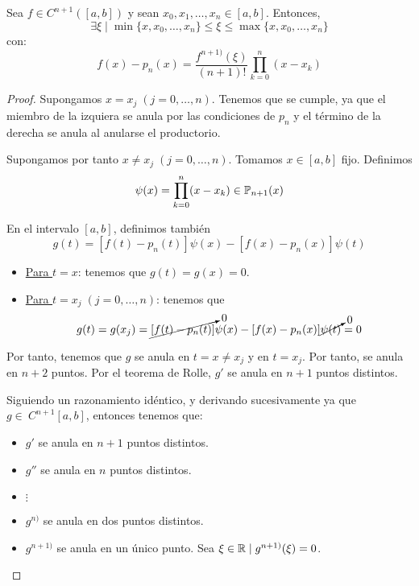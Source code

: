 \begin{teo}
    Sea $f\in C^{n+1}([a,b])$ y sean $x_0,x_1,\dots,x_n\in[a,b]$. Entonces,
    \begin{equation*}
        \exists \xi \mid \min\{x,x_0,\dots,x_n \} \leq \xi \leq \max\{x,x_0,\dots,x_n \} 
    \end{equation*}
    con:
    \begin{equation*}
        f(x)-p_n(x) = \frac{f^{n+1)}(\xi)}{(n+1)!}\prod_{k=0}^n (x-x_k)
    \end{equation*}
\end{teo}
\begin{proof}
    Supongamos $x=x_j\;(j=0,\dots,n)$. Tenemos que se cumple, ya que el miembro de la izquiera se anula por las condiciones de $p_n$ y el término de la derecha se anula al anularse el productorio.

    Supongamos por tanto $x\neq x_j\;(j=0,\dots,n)$. Tomamos $x\in[a,b]$ fijo. Definimos $$\psi (x) = \prod_{k=0}^n (x-x_k) \in \mathbb{P}_{n+1}(x)$$

    En el intervalo $[a,b]$, definimos también
    \begin{equation*}
        g(t) = [f(t)-p_n(t)]\psi(x) - [f(x)-p_n(x)]\psi(t)
    \end{equation*}
    \begin{itemize}
        \item \underline{Para $t=x$}: tenemos que $g(t)=g(x)=0$.
        
        \item \underline{Para $t=x_j\;(j=0,\dots,n)$}: tenemos que $$g(t)=g(x_j)=\cancelto{0}{[f(t)-p_n(t)]}\psi(x) - [f(x)-p_n(x)]\cancelto{0}{\psi(t)} = 0$$
    \end{itemize}

    Por tanto, tenemos que $g$ se anula en $t=x\neq x_j$ y en $t=x_j$. Por tanto, se anula en $n+2$ puntos. Por el teorema de Rolle, $g'$ se anula en $n+1$ puntos distintos.

    Siguiendo un razonamiento idéntico, y derivando sucesivamente ya que $g\in~C^{n+1}[a,b]$, entonces tenemos que:
    \begin{itemize}
        \item $g'$ se anula en $n+1$ puntos distintos.
        \item $g''$ se anula en $n$ puntos distintos.
        \item $\vdots$
        \item $g^{n)}$ se anula en dos puntos distintos.
        \item $g^{n+1)}$ se anula en un único punto. Sea $\xi \in \mathbb{R}\mid g^{n+1)}(\xi) = 0$.
    \end{itemize}



\end{proof}

